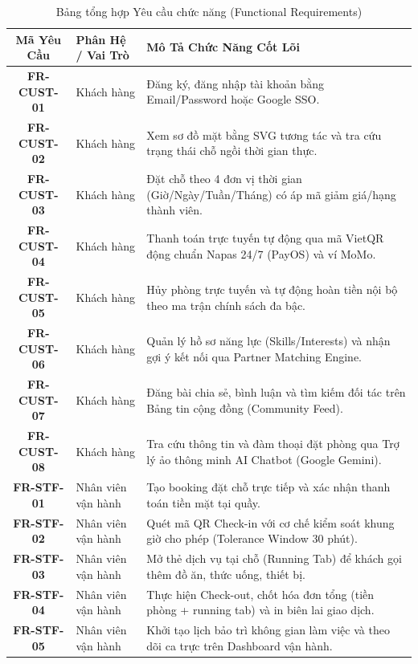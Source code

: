 \begin{table}[H]
\centering
\caption{Bảng tổng hợp Yêu cầu chức năng (Functional Requirements)}
\label{tab:functional-requirements}
\renewcommand{\arraystretch}{1.25}
\begin{tabular}{|c|l|p{7.5cm}|}
\hline
\textbf{Mã Yêu Cầu} & \textbf{Phân Hệ / Vai Trò} & \textbf{Mô Tả Chức Năng Cốt Lõi} \\
\hline
\textbf{FR-CUST-01} & Khách hàng & Đăng ký, đăng nhập tài khoản bằng Email/Password hoặc Google SSO. \\
\hline
\textbf{FR-CUST-02} & Khách hàng & Xem sơ đồ mặt bằng SVG tương tác và tra cứu trạng thái chỗ ngồi thời gian thực. \\
\hline
\textbf{FR-CUST-03} & Khách hàng & Đặt chỗ theo 4 đơn vị thời gian (Giờ/Ngày/Tuần/Tháng) có áp mã giảm giá/hạng thành viên. \\
\hline
\textbf{FR-CUST-04} & Khách hàng & Thanh toán trực tuyến tự động qua mã VietQR động chuẩn Napas 24/7 (PayOS) và ví MoMo. \\
\hline
\textbf{FR-CUST-05} & Khách hàng & Hủy phòng trực tuyến và tự động hoàn tiền nội bộ theo ma trận chính sách đa bậc. \\
\hline
\textbf{FR-CUST-06} & Khách hàng & Quản lý hồ sơ năng lực (Skills/Interests) và nhận gợi ý kết nối qua Partner Matching Engine. \\
\hline
\textbf{FR-CUST-07} & Khách hàng & Đăng bài chia sẻ, bình luận và tìm kiếm đối tác trên Bảng tin cộng đồng (Community Feed). \\
\hline
\textbf{FR-CUST-08} & Khách hàng & Tra cứu thông tin và đàm thoại đặt phòng qua Trợ lý ảo thông minh AI Chatbot (Google Gemini). \\
\hline
\textbf{FR-STF-01} & Nhân viên vận hành & Tạo booking đặt chỗ trực tiếp và xác nhận thanh toán tiền mặt tại quầy. \\
\hline
\textbf{FR-STF-02} & Nhân viên vận hành & Quét mã QR Check-in với cơ chế kiểm soát khung giờ cho phép (Tolerance Window 30 phút). \\
\hline
\textbf{FR-STF-03} & Nhân viên vận hành & Mở thẻ dịch vụ tại chỗ (Running Tab) để khách gọi thêm đồ ăn, thức uống, thiết bị. \\
\hline
\textbf{FR-STF-04} & Nhân viên vận hành & Thực hiện Check-out, chốt hóa đơn tổng (tiền phòng + running tab) và in biên lai giao dịch. \\
\hline
\textbf{FR-STF-05} & Nhân viên vận hành & Khởi tạo lịch bảo trì không gian làm việc và theo dõi ca trực trên Dashboard vận hành. \\

\end{tabular}
\end{table}

